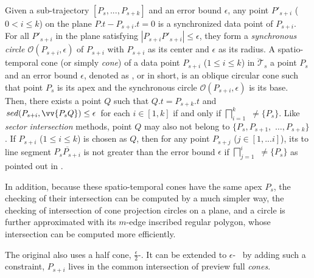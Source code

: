 Given a sub-trajectory $[P_s,...,P_{s+k}]$ and an error bound $\epsilon$, any point $P'_{s+i}$ ($0< i \le k$) on the plane $P.t-P_{s+i}.t = 0$ is a synchronized data point of $P_{s+i}$. For all $P'_{s+i}$ in the plane satisfying $|P_{s+i}P'_{s+i}| \le \epsilon$, they form a \textit{synchronous circle $\mathcal{O}(P_{s+i}, \epsilon)$} of $P_{s+i}$ with $P_{s+i}$ as its center and $\epsilon$ as its radius.
%
A spatio-temporal cone (or simply \textit{cone}) of a data point $P_{s+i}$ ($1\le i\le k$) in $\dddot{\mathcal{T}}_s$ \wrt a point $P_s$ and an error bound $\epsilon$, denoted as , or  in short, is an oblique circular cone such that point $P_s$ is its apex and the synchronous circle $\mathcal{O}(P_{s+i}, \epsilon)$ is its base.
%
Then, there exists a point $Q$ such that $Q.t = P_{s+k}.t$ and $sed(P_{s+i}, \vv{P_sQ})\le \epsilon$ for each $i \in [1,k]$ if and only if $\bigsqcap_{i=1}^{k}$ $\ne \{P_s\}$.
%
Like \textit{sector intersection} methods, point $Q$ may also not belong to $\{P_{s}, P_{s+1},$ $\ldots, P_{s+k}\}$. If $P_{s+i}$ ($1\le i\le k$) is chosen as $Q$, then for any point $P_{s+j}$ ($j \in [1, ... i]$), its \sed to
line segment $\overline{P_sP_{s+i}}$ is not greater than the error bound $\epsilon$ if
$\bigsqcap_{j=1}^{i}$ $\ne \{P_s\}$ as pointed out in \cite{Lin:Cised}.

In addition, because these spatio-temporal cones have the same apex $P_s$, the checking of their intersection can be computed by a much simpler way, \ie the checking of intersection of cone projection circles on a plane, and a circle is further approximated with its $m$-edge inscribed regular polygon, whose intersection can be computed more efficiently. %

The original \cised also uses a half cone, $\frac{\epsilon}{2}$-\cone. It can be extended to ${\epsilon}$-\cone ~ by adding such a constraint, \ie $P_{s+i}$ lives in the common intersection of preview full \emph{cones}.




